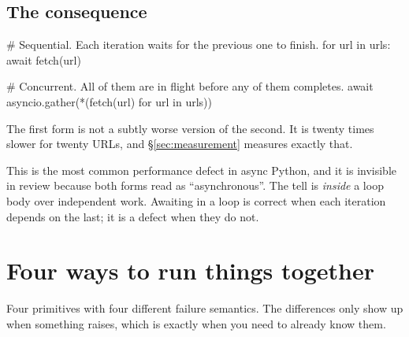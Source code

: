 
\subsection{The consequence}
\label{sec:sequential-trap}

\begin{python}[caption={A queue wearing the costume of concurrency}, label={lst:seq-trap}]
# Sequential. Each iteration waits for the previous one to finish.
for url in urls:
    await fetch(url)

# Concurrent. All of them are in flight before any of them completes.
await asyncio.gather(*(fetch(url) for url in urls))
\end{python}

The first form is not a subtly worse version of the second. It is twenty times
slower for twenty URLs, and \S\ref{sec:measurement} measures exactly that.

\begin{warning}
This is the most common performance defect in async Python, and it is invisible
in review because both forms read as ``asynchronous''. The tell is 
\emph{inside} a loop body over independent work. Awaiting in a loop is correct
when each iteration depends on the last; it is a defect when they do not.
\end{warning}

\section{Four ways to run things together}
\label{sec:four-ways}

Four primitives with four different failure semantics. The differences only show
up when something raises, which is exactly when you need to already know them.

